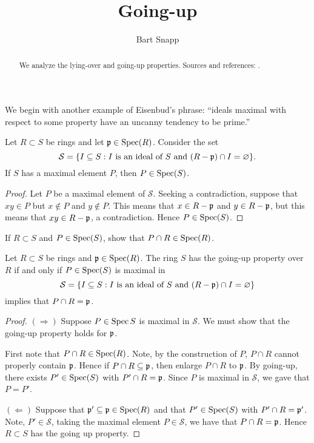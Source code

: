 \documentclass{ximera}
\author{Bart Snapp}
\title{Going-up}
\begin{document}
\begin{abstract}
  We analyze the lying-over and going-up properties. Sources and references:
  \cite{iK1974}.
\end{abstract}
\maketitle


We begin with another example of Eisenbud's phrase: ``ideals maximal
with respect to some property have an uncanny tendency to be prime.''


\begin{proposition}
  Let $R\subset S$ be rings and let $\mathfrak{p}\in\operatorname{Spec}(R)$. Consider the set
  \[
  \mathcal{S} = \{I\subseteq S: \text{$I$ is an ideal of $S$ and $(R-\mathfrak{p})\cap I = \varnothing$}\}.
  \]
  If $S$ has a maximal element $P$, then $P\in\operatorname{Spec}(S)$.
  \begin{proof}
    Let $P$ be a maximal element of $\mathcal{S}$. Seeking a
    contradiction, suppose that $xy\in P$ but $x\notin P$ and $y\notin
    P$. This means that $x\in R-\mathfrak{p}$ and $y\in R-\mathfrak{p}$, but this means
    that $xy\in R-\mathfrak{p}$, a contradiction. Hence $P\in\operatorname{Spec}(S)$.
  \end{proof}
\end{proposition}

\begin{exercise}
  If $R\subset S$ and $P\in\operatorname{Spec}(S)$, show that $P\cap R\in\operatorname{Spec}(R)$.
\end{exercise}


\begin{proposition}
  Let $R\subset S$ be rings and $\mathfrak{p}\in\operatorname{Spec}(R)$. The ring $S$ has the
  going-up property over $R$ if and only if $P\in\operatorname{Spec}(S)$ is maximal in
  \[
  \mathcal{S} = \{I\subseteq S: \text{$I$ is an ideal of $S$ and
    $(R-\mathfrak{p})\cap I = \varnothing$}\}
  \]
  implies that $P\cap R = \mathfrak{p}$.
  \begin{proof}
    $(\Rightarrow)$ Suppose $P\in\operatorname{Spec}{S}$ is maximal in
    $\mathcal{S}$. We must show that the going-up property holds for
    $\mathfrak{p}$.

    First note that $P\cap R\in\operatorname{Spec}(R)$. Note, by the construction of
    $P$, $P\cap R$ cannot properly contain $\mathfrak{p}$. Hence if $P\cap
    R\subseteq \mathfrak{p}$, then enlarge $P\cap R$ to $\mathfrak{p}$. By going-up, there
    exists $P'\in\operatorname{Spec}(S)$ with $P'\cap R = \mathfrak{p}$. Since $P$ is maximal
    in $\mathcal{S}$, we gave that $P=P'$.

    $(\Leftarrow)$ Suppose that $\mathfrak{p}'\subseteq\mathfrak{p}\in\operatorname{Spec}(R)$ and that
    $P'\in\operatorname{Spec}(S)$ with $P'\cap R = \mathfrak{p}'$. Note, $P'\in\mathcal{S}$,
    taking the maximal element $P\in\mathcal{S}$, we have that $P\cap
    R = \mathfrak{p}$. Hence $R\subset S$ has the going up property.
  \end{proof}
\end{proposition}
\end{document}

